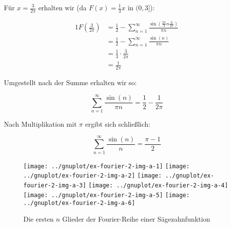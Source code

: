 Für $x=\frac{3}{2\pi}$ erhalten wir (da $F(x)=\frac{1}{3}x$ in $(0,3]$):

\begin{alignat*}{1}
	F(\frac{3}{2\pi}) &= \frac{1}{2} - \sum\limits_{n=1}^\infty \frac{\sin(\frac{2\pi}{3}n\frac{3}{2\pi})}{\pi n} \\
	                  &= \frac{1}{2} - \sum\limits_{n=1}^\infty \frac{\sin(n)}{\pi n} \\
	                  &= \frac{1}{3} \cdot \frac{3}{2\pi} \\
	                  &= \frac{1}{2\pi}
\end{alignat*}

Umgestellt nach der Summe erhalten wir so:

$$
	\sum\limits_{n=1}^\infty \frac{\sin(n)}{\pi n} = \frac{1}{2}-\frac{1}{2\pi}
$$

Nach Multiplikation mit $\pi$ ergibt sich schließlich:

$$
	\sum\limits_{n=1}^\infty \frac{\sin(n)}{n} = \frac{\pi-1}{2}
$$

\begin{figure}
	\centering
	\texttt{[image: ../gnuplot/ex-fourier-2-img-a-1]}
	\texttt{[image: ../gnuplot/ex-fourier-2-img-a-2]}
	\texttt{[image: ../gnuplot/ex-fourier-2-img-a-3]}
	\texttt{[image: ../gnuplot/ex-fourier-2-img-a-4]}
	\texttt{[image: ../gnuplot/ex-fourier-2-img-a-5]}
	\texttt{[image: ../gnuplot/ex-fourier-2-img-a-6]}
	\caption{Die ersten $n$ Glieder der Fourier-Reihe einer Sägezahnfunktion}
	\label{fig:FourierChainsaw}
\end{figure}